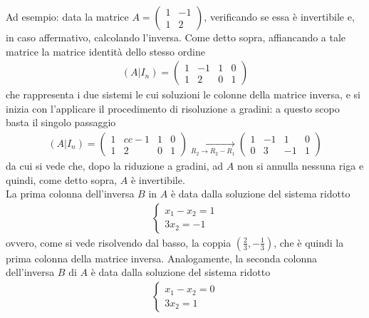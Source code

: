 Ad esempio: data la matrice $A=
\begin{pmatrix}
  1 & -1\\
  1 & 2
\end{pmatrix}
$, verificando se essa è invertibile e, in caso affermativo,
calcolando l'inversa. Come detto sopra, affiancando a tale matrice
la matrice identità dello stesso ordine
\begin{eqnarray*}
  (A|I_n)=\left(
  \begin{array}{cc|cc}
    1 & -1 & 1 & 0\\
    1 &  2 & 0 & 1
  \end{array}
  \right)
\end{eqnarray*}
che rappresenta i due sistemi le cui soluzioni le colonne della
matrice inversa, e si inizia con l'applicare il procedimento di
risoluzione a gradini: a questo scopo basta il singolo passaggio
\begin{eqnarray}
  \label{eq:Compinveeproddimatrici13}
  (A|I_n)=\left(
  \begin{array}{cc|cc}
    1 & cc-1 & 1 & 0 \\
    1 & 2 & 0 & 1
  \end{array}\right) \underset{R_2\to R_2-R_1}{\to}\left(
  \begin{array}{cc|cc}
    1 & -1 & 1 & 0\\
    0 & 3 & -1 & 1
  \end{array}\right)
\end{eqnarray}
da cui si vede che, dopo la riduzione a gradini, ad $A$ non si
annulla nessuna riga e quindi, come detto sopra, $A$ è
invertibile.\\
La prima colonna dell'inversa $B$ in $A$ è data dalla soluzione del
sistema ridotto
\begin{eqnarray}
  \label{eq:Compinveeproddimatrici14}
  \begin{cases}
    x_1-x_2=1\\
    3x_2=-1
  \end{cases}
\end{eqnarray}
ovvero, come si vede risolvendo dal basso, la coppia
$\left(\frac{2}{3},-\frac{1}{3}\right)$, che è quindi la prima
colonna della matrice inversa. Analogamente, la seconda colonna
dell'inversa $B$ di $A$ è data dalla soluzione del sistema ridotto
\begin{eqnarray}
  \label{eq:Compinveeproddimatrici15}
  \begin{cases}
    x_1-x_2=0\\
    3x_2=1
  \end{cases}
\end{eqnarray}
